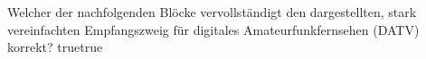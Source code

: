     {Welcher der nachfolgenden Blöcke vervollständigt den dargestellten, stark vereinfachten Empfangszweig für digitales Amateurfunkfernsehen (DATV) korrekt?}
    {}
    {}
    {}
    {}
    {true}{true}